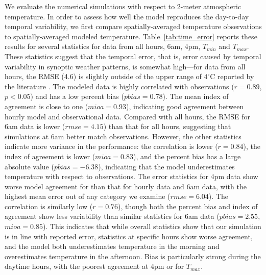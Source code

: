 \documentclass[draft,linenumbers]{agujournal}
\begin{document}
We evaluate the numerical simulations with respect to 2-meter atmospheric temperature. In order to assess how well the model reproduces the day-to-day temporal variability, we first compare spatially-averaged temperature observations to spatially-averaged modeled temperature. Table~\ref{tab:time_error} reports these results for several statistics for data from all hours, 6am, 4pm, $T_{min}$ and $T_{max}$.  
These statistics suggest that the temporal error, that is, error caused by temporal variability in synoptic weather patterns, is somewhat high---for data from all hours, the RMSE (4.6) is slightly outside of the upper range of $4^\circ$C reported by the literature \citep{kim2013evaluation}. 
The modeled data is highly correlated with observations ($r=0.89$, $p<0.05$) and has a low percent bias ($pbias = 0.78$). The mean index of agreement is close to one ($mioa=0.93$), indicating good agreement between hourly model and observational data.
Compared with all hours, the RMSE for 6am data is lower ($rmse= 4.15$) than that for all hours, suggesting that simulations at 6am better match observations. However, the other statistics indicate more variance in the performance:  the correlation is lower ($r=0.84$), the index of agreement is lower ($mioa=0.83$), and the percent bias has a large absolute value ($pbias=-6.38$), indicating that the model underestimates temperature with respect to observations. 
%
The error statistics for 4pm data show worse model agreement for than that for hourly data and 6am data, with the highest mean error out of any category we examine ($rmse=6.04$). The correlation is similarly low ($r=0.76$), though both the percent bias and index of agreement show less variability than similar statistics for 6am data ($pbias=2.55$, $mioa=0.85$). This indicates that while overall statistics show that our simulation is in line with reported error, statistics at specific hours show worse agreement, and the model both underestimates temperature in the morning and overestimates temperature in the afternoon. Bias is particularly strong during the daytime hours, with the poorest agreement at 4pm or for $T_{max}$. 
\end{document}
